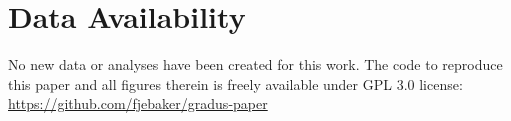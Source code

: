 \documentclass[fleqn,usenatbib]{mnras}
\begin{document}
\section*{Data Availability}

No new data or analyses have been created for this work. The code to reproduce
this paper and all figures therein is freely available under GPL 3.0 license:
\url{https://github.com/fjebaker/gradus-paper}










\appendix



% 
% 
% 
% 




\bsp    %
\label{lastpage}
\end{document}
